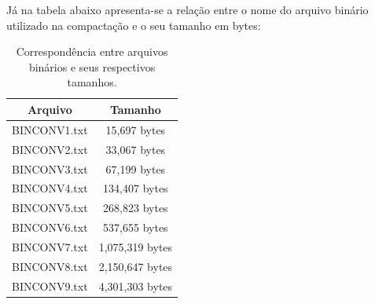 \documentclass[
	article,			
	11pt,				
	oneside,			
	a4paper,			
	english,			
	brazil,				
	sumario=tradicional
	]{abntex2}
\begin{document}
\begin{table}[h!]
  \begin{center}
    \label{tab:table2}
    \caption{Correspondência entre arquivos texto e seus respectivos tamanhos.}
  \end{center}
\end{table}

Já na tabela abaixo apresenta-se a relação entre o nome do arquivo binário utilizado na compactação e o seu tamanho em bytes:

\begin{table}[h!]
  \begin{center}
    \label{tab:table3}
    \begin{tabular}{c|c}
      \textbf{Arquivo} & \textbf{Tamanho}\\
      \hline
      BINCONV1.txt & 15,697 bytes\\
      BINCONV2.txt & 33,067 bytes\\
      BINCONV3.txt & 67,199 bytes\\
      BINCONV4.txt & 134,407 bytes\\
      BINCONV5.txt & 268,823 bytes\\
      BINCONV6.txt & 537,655 bytes\\
      BINCONV7.txt & 1,075,319 bytes\\
      BINCONV8.txt & 2,150,647 bytes\\
      BINCONV9.txt & 4,301,303 bytes\\
    \end{tabular}
    \caption{Correspondência entre arquivos binários e seus respectivos tamanhos.}
  \end{center}
\end{table}
\end{document}
